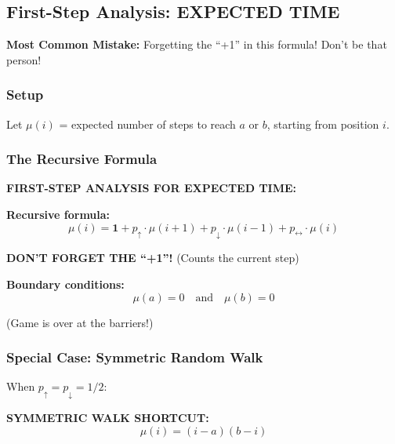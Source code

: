 \documentclass[10pt,letterpaper]{article}
\begin{document}
\subsection{First-Step Analysis: EXPECTED TIME}

\begin{criticalbox}
\textbf{Most Common Mistake:} Forgetting the ``+1'' in this formula! Don't be that person!
\end{criticalbox}

\subsubsection{Setup}

Let $\mu(i)$ = expected number of steps to reach $a$ or $b$, starting from position $i$.

\subsubsection{The Recursive Formula}

\begin{formulabox}[colback=red!10,colframe=red!80]
\textbf{FIRST-STEP ANALYSIS FOR EXPECTED TIME:}

\vspace{0.2cm}

\textbf{Recursive formula:}
\[
\boxed{\mu(i) = \mathbf{1} + p_{\uparrow} \cdot \mu(i+1) + p_{\downarrow} \cdot \mu(i-1) + p_{\leftrightarrow} \cdot \mu(i)}
\]

\textbf{DON'T FORGET THE ``+1''!} (Counts the current step)

\vspace{0.2cm}

\textbf{Boundary conditions:}
\[
\boxed{\mu(a) = 0 \quad \text{and} \quad \mu(b) = 0}
\]

(Game is over at the barriers!)
\end{formulabox}

\subsubsection{Special Case: Symmetric Random Walk}

When $p_{\uparrow} = p_{\downarrow} = 1/2$:

\begin{formulabox}
\textbf{SYMMETRIC WALK SHORTCUT:}
\[
\boxed{\mu(i) = (i - a)(b - i)}
\]
\end{formulabox}
\end{document}
